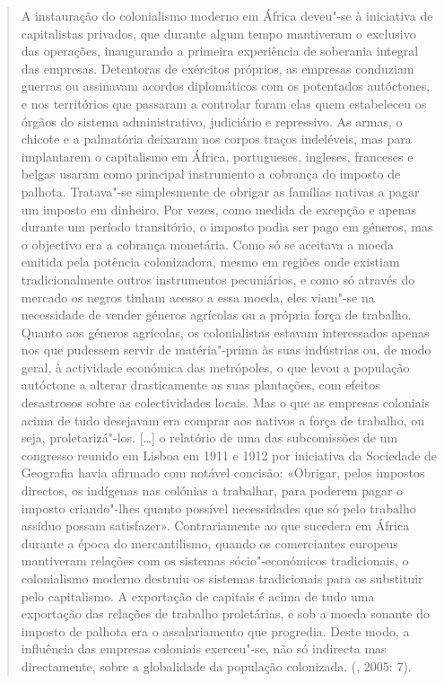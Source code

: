 \begin{quote}
A instauração do colonialismo moderno em África deveu"-se à iniciativa de
capitalistas privados, que durante algum tempo mantiveram o exclusivo
das operações, inaugurando a primeira experiência de soberania integral
das empresas. Detentoras de exércitos próprios, as empresas conduziam
guerras ou assinavam acordos diplomáticos com os potentados autóctones,
e nos territórios que passaram a controlar foram elas quem estabeleceu
os órgãos do sistema administrativo, judiciário e repressivo. As armas,
o chicote e a palmatória deixaram nos corpos traços indeléveis, mas para
implantarem o capitalismo em África, portugueses, ingleses, franceses e
belgas usaram como principal instrumento a cobrança do imposto de
palhota. Tratava"-se simplesmente de obrigar as famílias nativas a pagar
um imposto em dinheiro. Por vezes, como medida de excepção e apenas
durante um período transitório, o imposto podia ser pago em géneros, mas
o objectivo era a cobrança monetária. Como só se aceitava a moeda
emitida pela potência colonizadora, mesmo em regiões onde existiam
tradicionalmente outros instrumentos pecuniários, e como só através do
mercado os negros tinham acesso a essa moeda, eles viam"-se na
necessidade de vender géneros agrícolas ou a própria força de trabalho.
Quanto aos géneros agrícolas, os colonialistas estavam interessados
apenas nos que pudessem servir de matéria"-prima às suas indústrias ou,
de modo geral, à actividade económica das metrópoles, o que levou a
população autóctone a alterar drasticamente as suas plantações, com
efeitos desastrosos sobre as colectividades locais. Mas o que as
empresas coloniais acima de tudo desejavam era comprar aos nativos a
força de trabalho, ou seja, proletarizá"-los. {[}\ldots{}{]} o relatório de
uma das subcomissões de um congresso reunido em Lisboa em 1911 e 1912
por iniciativa da Sociedade de Geografia havia afirmado com notável
concisão: «Obrigar, pelos impostos directos, os indígenas nas colónias a
trabalhar, para poderem pagar o imposto criando"-lhes quanto possível
necessidades que só pelo trabalho assíduo possam satisfazer».
Contrariamente ao que sucedera em África durante a época do
mercantilismo, quando os comerciantes europeus mantiveram relações com
os sistemas sócio"-económicos tradicionais, o colonialismo moderno
destruiu os sistemas tradicionais para os substituir pelo capitalismo. A
exportação de capitais é acima de tudo uma exportação das relações de
trabalho proletárias, e sob a moeda sonante do imposto de palhota era o
assalariamento que progredia. Deste modo, a influência das empresas
coloniais exerceu"-se, não só indirecta mas directamente, sobre a
globalidade da população colonizada. (, 2005: 7).
\end{quote}

